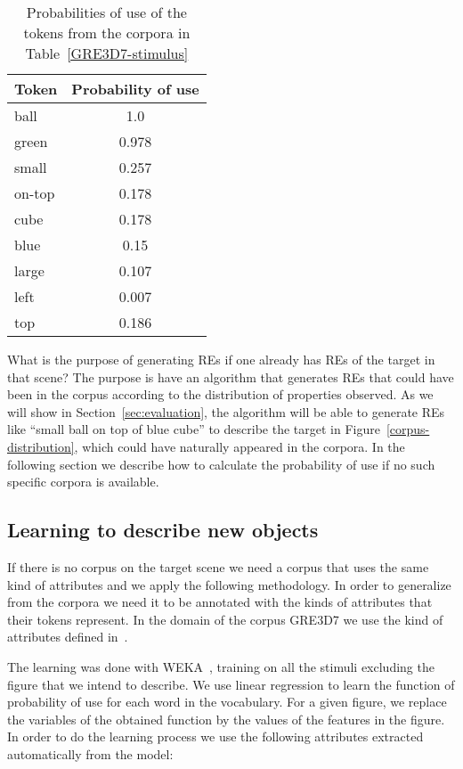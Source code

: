 \begin{table}[h!]
\begin{center}
\begin{tabular}{|l|c|}
\hline
Token & Probability of use \\
\hline
ball & 1.0 \\
green & 0.978 \\
small & 0.257 \\
on-top & 0.178 \\ 
cube & 0.178 \\
blue & 0.15 \\
large & 0.107 \\
left & 0.007 \\
top & 0.186 \\
\hline
\end{tabular}
\caption{Probabilities of use of the tokens from the corpora in Table~\ref{GRE3D7-stimulus}\label{probability-of-use}}
\end{center}
\end{table}

What is the purpose of generating REs if one already has REs of the target in that scene? The purpose is have an algorithm that generates REs that could have been in the corpus according to the distribution of properties observed. As we will show in Section~\ref{sec:evaluation}, the algorithm will be able to generate REs like ``small ball on top of blue cube'' to describe the target in Figure~\ref{corpus-distribution}, which could have naturally appeared in the corpora. In the following section we describe how to calculate the probability of use if no such specific corpora is available. 

\subsection{Learning to describe new objects}

If there is no corpus on the target scene we need a corpus that uses the same kind of attributes and we apply the following methodology. In order to generalize from the corpora we need it to be annotated with the kinds of attributes that their tokens represent. In the domain of the corpus GRE3D7 we use the kind of attributes defined in~\cite{viet:gene11}. 

The learning was done with WEKA~\cite{Hall:WEK09}, training on all the stimuli excluding the figure that we intend to describe. We use linear regression to learn the function of probability of use for each word in the vocabulary. For a given figure, we replace the variables of the obtained function by the values of the features in the figure. In order to do the learning process we use the following attributes extracted automatically from the model:  

